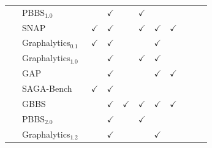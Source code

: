\begin{landscape}
\begin{table}[htbp]
\begin{tabular}{ll|ccccccccc}
               {\footnotesize ~              }  & {\footnotesize PBBS$_{1.0}$~\cite{Shun2012}            }      &               & $\checkmark$  &               & $\checkmark$  &               &               &                &               &               \\
               {\footnotesize ~              }  & {\footnotesize SNAP~\cite{Leskovec2016}                }      & $\checkmark$  & $\checkmark$  &               & $\checkmark$  & $\checkmark$  & $\checkmark$  &                &               &               \\
               {\footnotesize ~              }  & {\footnotesize Graphalytics$_{0.1}$~\cite{Capota2015}  }      & $\checkmark$  & $\checkmark$  &               &               & $\checkmark$  &               &                &               &               \\
               {\footnotesize ~              }  & {\footnotesize Graphalytics$_{1.0}$~\cite{Iosup2016}   }      &               & $\checkmark$  &               & $\checkmark$  & $\checkmark$  &               &                &               &               \\
               {\footnotesize ~              }  & {\footnotesize GAP~\cite{Beamer2017}                   }      &               & $\checkmark$  &               &               & $\checkmark$  & $\checkmark$  &                &               &               \\
               {\footnotesize ~              }  & {\footnotesize SAGA-Bench~\cite{Basak2020}             }      & $\checkmark$  & $\checkmark$  &               &               &               &               &                &               &               \\
               {\footnotesize ~              }  & {\footnotesize GBBS~\cite{Dhulipala2020,Dhulipala2021} }      &               & $\checkmark$  & $\checkmark$  & $\checkmark$  & $\checkmark$  & $\checkmark$  &                &               &               \\
               {\footnotesize ~              }  & {\footnotesize PBBS$_{2.0}$~\cite{Anderson2022}        }      &               & $\checkmark$  &               & $\checkmark$  &               &               &                &               &               \\
               {\footnotesize ~              }  & {\footnotesize Graphalytics$_{1.2}$~\cite{Iosup2023}   }      &               & $\checkmark$  &               &               & $\checkmark$  &               &                &               &               \\

\end{tabular}
\end{table}
\end{landscape}
